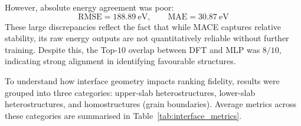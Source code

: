 However, absolute energy agreement was poor:
\begin{equation}
    \text{RMSE} = 188.89~\text{eV}, \qquad \text{MAE} = 30.87~\text{eV}
\end{equation}
These large discrepancies reflect the fact that while MACE captures relative stability, its raw energy outputs are not quantitatively reliable without further training.
Despite this, the Top-$10$ overlap between DFT and MLP was $8/10$, indicating strong alignment in identifying favourable structures.

To understand how interface geometry impacts ranking fidelity, results were grouped into three categories: upper-slab heterostructures, lower-slab heterostructures, and homostructures (grain boundaries).
Average metrics across these categories are summarised in Table~\ref{tab:interface_metrics}.
